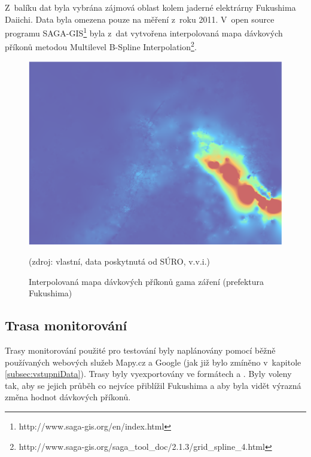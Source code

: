 Z~balíku dat byla vybrána zájmová oblast kolem jaderné elektrárny Fukushima Daiichi. Data byla omezena pouze na měření z~roku 2011. V~open source programu SAGA-GIS\footnote{http://www.saga-gis.org/en/index.html} byla z~dat vytvořena interpolovaná mapa dávkových příkonů metodou Multilevel B-Spline Interpolation\footnote{http://www.saga-gis.org/saga\_tool\_doc/2.1.3/grid\_spline\_4.html}.

\begin{figure}[H]
    \centering
    \includegraphics[scale=0.4]{./pictures/interpolovana_mapa.png}
      	\caption[Interpolovaná mapa dávkových příkonů (prefektura Fukushima)]{Interpolovaná mapa dávkových příkonů gama záření (prefektura Fukushima)}(zdroj: vlastní, data poskytnutá od SÚRO, v.v.i.)
    	\label{fig:interpolatedMap}
\end{figure} 

\subsection{Trasa monitorování}
Trasy monitorování použité pro testování byly naplánovány pomocí běžně používaných webových služeb Mapy.cz a Google (jak již bylo zmíněno v~kapitole \ref{subsec:vstupniData}). Trasy byly vyexportovány ve formátech  a . Byly voleny tak, aby se jejich průběh co nejvíce přiblížil  Fukushima a aby byla vidět výrazná změna hodnot dávkových příkonů.

